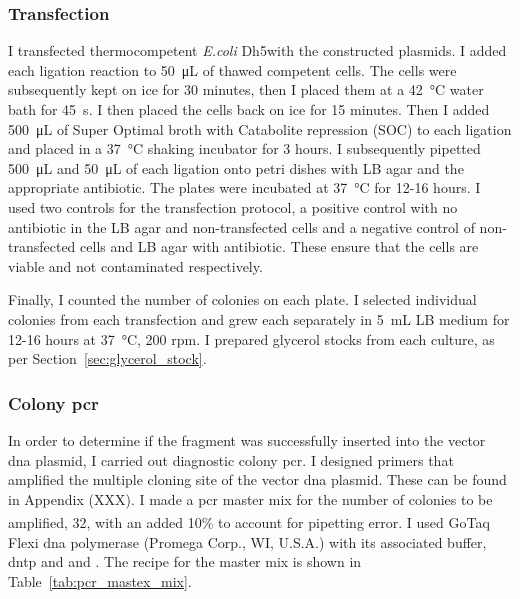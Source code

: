 \subsubsection{Transfection}
\label{sec:transfection}
I transfected thermocompetent \textit{E.coli} Dh5\textalpha with the constructed plasmids. I added each ligation reaction to \SI{50}{\micro\liter} of thawed competent cells. The cells were subsequently kept on ice for 30 minutes, then I placed them at a \SI{42}{\celsius} water bath for \SI{45}{\second}. I then placed the cells back on ice for 15 minutes. Then I added \SI{500}{\micro\liter} of Super Optimal broth with Catabolite repression (SOC) to each ligation and placed in a \SI{37}{\celsius} shaking incubator for 3 hours. I subsequently pipetted \SI{500}{\micro\liter} and \SI{50}{\micro\liter} of each ligation onto petri dishes with LB agar and the appropriate antibiotic. The plates were incubated at \SI{37}{\celsius} for 12-16 hours. I used two controls for the transfection protocol, a positive control with no antibiotic in the LB agar and non-transfected cells and a negative control of non-transfected cells and LB agar with antibiotic. These ensure that the cells are viable and not contaminated respectively. 

Finally, I counted the number of colonies on each plate. I selected individual colonies from each transfection and grew each separately in \SI{5}{\milli\liter} LB medium for 12-16 hours at \SI{37}{\celsius}, 200 rpm. I prepared glycerol stocks from each culture, as per Section~\ref{sec:glycerol_stock}.



\subsubsection{Colony \acrshort{pcr}}

In order to determine if the fragment was successfully inserted into the vector \acrshort{dna} plasmid, I carried out diagnostic colony \acrshort{pcr}. I designed primers that amplified the multiple cloning site of the vector \acrshort{dna} plasmid. These can be found in Appendix (XXX). I made a \acrshort{pcr} master mix for the number of colonies to be amplified, 32, with an added 10\% to account for pipetting error. I used GoTaq\textsuperscript{\textregistered} Flexi \acrshort{dna} polymerase (Promega Corp., WI, U.S.A.) with its associated buffer, \acrshort{dntp} and and . The recipe for the master mix is shown in Table~\ref{tab:pcr_mastex_mix}.

